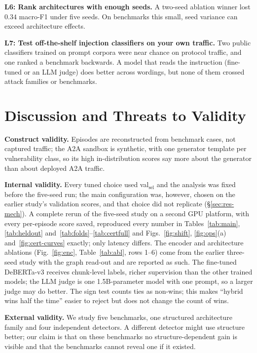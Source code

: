 \documentclass[conference,compsoc]{IEEEtran}
\begin{document}
\textbf{L6: Rank architectures with enough seeds.} A two-seed ablation winner lost $0.34$ macro-F1 under five seeds. On benchmarks this small, seed variance can exceed architecture effects.

\textbf{L7: Test off-the-shelf injection classifiers on your own traffic.} Two public classifiers trained on prompt corpora were near chance on protocol traffic, and one ranked a benchmark backwards. A model that reads the instruction (fine-tuned or an LLM judge) does better across wordings, but none of them crossed attack families or benchmarks.

\section{Discussion and Threats to Validity}
\label{sec:disc}
\label{sec:limits}
\textbf{Construct validity.} Episodes are reconstructed from benchmark cases, not captured traffic; the A2A sandbox is synthetic, with one generator template per vulnerability class, so its high in-distribution scores say more about the generator than about deployed A2A traffic.

\textbf{Internal validity.} Every tuned choice used val$_{\text{sel}}$ and the analysis was fixed before the five-seed run; the main configuration was, however, chosen on the earlier study's validation scores, and that choice did not replicate (\S\ref{sec:res-mech}). A complete rerun of the five-seed study on a second GPU platform, with every per-episode score saved, reproduced every number in Tables~\ref{tab:main}, \ref{tab:heldout} and~\ref{tab:folds}--\ref{tab:certfull} and Figs.~\ref{fig:shift}, \ref{fig:ops}(a) and~\ref{fig:cert-curves} exactly; only latency differs. The encoder and architecture ablations (Fig.~\ref{fig:enc}, Table~\ref{tab:abl}, rows 1--6) come from the earlier three-seed study with the graph read-out and are reported as such. The fine-tuned DeBERTa-v3 receives chunk-level labels, richer supervision than the other trained models; the LLM judge is one 1.5B-parameter model with one prompt, so a larger judge may do better. The sign test counts ties as non-wins; this makes ``hybrid wins half the time'' easier to reject but does not change the count of wins.

\textbf{External validity.} We study five benchmarks, one structured architecture family and four independent detectors. A different detector might use structure better; our claim is that on these benchmarks no structure-dependent gain is visible and that the benchmarks cannot reveal one if it existed.
\end{document}
